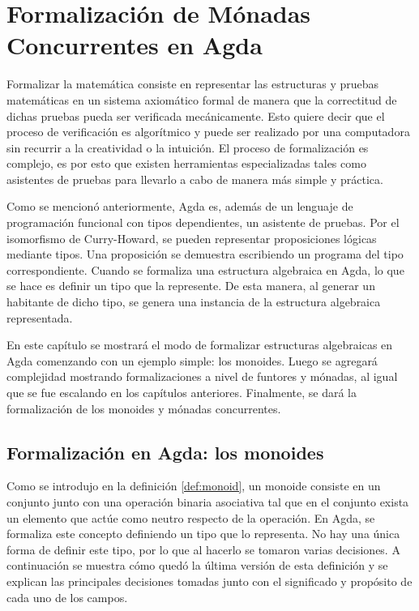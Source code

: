 \chapter{Formalización de Mónadas Concurrentes en Agda}\label{chapter:form} 

Formalizar la matemática consiste en representar las estructuras y pruebas matemáticas en un sistema axiomático formal de manera que la correctitud de dichas pruebas pueda ser verificada mecánicamente. Esto quiere decir que el proceso de verificación es algorítmico y puede ser realizado por una computadora sin recurrir a la creatividad o la intuición. El proceso de formalización es complejo, es por esto que existen herramientas especializadas tales como asistentes de pruebas para llevarlo a cabo de manera más simple y práctica. 

Como se mencionó anteriormente, Agda es, además de un lenguaje de programación funcional con tipos dependientes, un asistente de pruebas. Por el isomorfismo de Curry-Howard, se pueden representar proposiciones lógicas mediante tipos. Una proposición se demuestra escribiendo un programa del tipo correspondiente. Cuando se formaliza una estructura algebraica en Agda, lo que se hace es definir un tipo que la represente. De esta manera, al generar un habitante de dicho tipo, se genera una instancia de la estructura algebraica representada. 

En este capítulo se mostrará el modo de formalizar estructuras algebraicas en Agda comenzando con un ejemplo simple: los monoides. Luego se agregará complejidad mostrando formalizaciones a nivel de funtores y mónadas, al igual que se fue escalando en los capítulos anteriores. Finalmente, se dará la formalización de los monoides y mónadas concurrentes.

\section{Formalización en Agda: los monoides}\label{form:monoids}

Como se introdujo en la definición \ref{def:monoid}, un monoide consiste en un conjunto junto con una operación binaria asociativa tal que en el conjunto exista un elemento que actúe como neutro respecto de la operación. En Agda, se formaliza este concepto definiendo un tipo  que lo representa. No hay una única forma de definir este tipo, por lo que al hacerlo se tomaron varias decisiones. A continuación se muestra cómo quedó la última versión de esta definición y se explican las principales decisiones tomadas junto con el significado y propósito de cada uno de los campos. 

